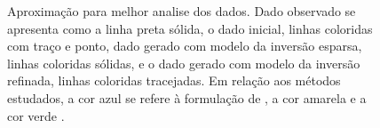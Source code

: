 \begin{figure}[H]
	\centering
	
	\caption{Aproximação para melhor analise dos dados. Dado observado se apresenta como a linha preta sólida, o dado inicial, linhas coloridas com traço e ponto, dado gerado com modelo da inversão esparsa, linhas coloridas sólidas, e o dado gerado com modelo da inversão refinada, linhas coloridas tracejadas. Em relação aos métodos estudados, a cor azul se refere à formulação de , a cor amarela  e a cor verde .}
	\label{fig:zoom_in}
\end{figure}


